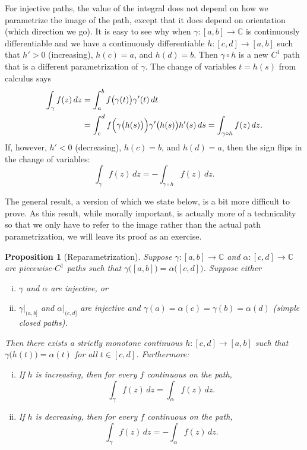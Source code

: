 \documentclass[12pt,openany]{book}
\newcommand{\C}{{\mathbb{C}}}
\theoremstyle{plain}
\newtheorem{prop}[thm]{Proposition}
\theoremstyle{remark}
\theoremstyle{definition}
\theoremstyle{exercise}
\theoremstyle{example}
\begin{document}
For injective paths, the value of the integral does not depend on how
we parametrize the image of the path,
except that it does depend on orientation (which direction we go).
It is easy to see why when
$\gamma \colon [a,b] \to \C$ is continuously differentiable and we have
a continuously differentiable $h \colon [c,d] \to [a,b]$ such
that $h' > 0$ (increasing), $h(c)=a$, and $h(d) = b$.  Then $\gamma \circ h$ is a new
$C^1$ path that is a different parametrization of $\gamma$.
The change of variables $t=h(s)$ from calculus says
\begin{equation*}
\begin{split}
\int_{\gamma} f(z) \, dz
& =
\int_a^b f\bigl( \gamma(t) \bigr) \gamma'(t) \, dt
\\
& =
\int_c^d f\Bigl( \gamma\bigl(h(s)\bigr) \Bigr) \gamma'\bigl(h(s)\bigr) h'(s) \, ds
=
\int_{\gamma \circ h} f(z) \, dz.
\end{split}
\end{equation*}
If, however, $h' < 0$ (decreasing), $h(c)=b$, and $h(d)=a$, then the
sign flips in the change of variables:
\begin{equation*}
\int_{\gamma} f(z) \, dz =
- \int_{\gamma \circ h} f(z) \, dz.
\end{equation*}

The general result, a version of which we state below,
is a bit more difficult to prove.
As this result, while
morally important, is actually more of a technicality so that we only have
to refer to the image rather than the actual path parametrization, we will
leave its proof as an exercise.

\begin{prop}[Reparametrization]%
\label{prop:reparam}
Suppose $\gamma \colon [a,b] \to \C$ and $\alpha \colon [c,d] \to \C$ are
piecewise-$C^1$ paths such that
$\gamma\bigl([a,b]\bigr) = \alpha\bigl([c,d]\bigr)$.
Suppose either
\begin{enumerate}[(i)]
\item
$\gamma$ and $\alpha$ are injective, or
\item
$\gamma|_{(a,b]}$ and
$\alpha|_{(c,d]}$ are injective and 
$\gamma(a)=\alpha(c)=\gamma(b)=\alpha(d)$ (simple closed paths).
\end{enumerate}
Then there exists a strictly monotone continuous $h \colon [c,d] \to [a,b]$ such
that $\gamma\bigl(h(t)\bigr) = \alpha(t)$ for all $t \in [c,d]$.
Furthermore:
\begin{enumerate}[(i)]
\item
If $h$ is increasing, then for every $f$ continuous on the path,
\begin{equation*}
\int_\gamma f(z) \, dz = \int_{\alpha} f(z) \, dz .
\end{equation*}
\item
If $h$ is decreasing, then for every $f$ continuous on the path,
\begin{equation*}
\int_\gamma f(z) \, dz = - \int_{\alpha} f(z) \, dz .
\end{equation*}
\end{enumerate}
\end{prop}
\end{document}
